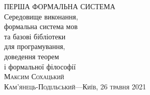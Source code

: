 \frontmatter
\thispagestyle{empty}
\mbox{}\vspace{1in}
\noindent
\begin{flushright}
\vspace{0.5cm}
\Huge ПЕРША ФОРМАЛЬНА СИСТЕМА \\
\vspace{0.5cm}
{\huge Середовище виконання, \\
        \huge формальна система мов \\
        \huge та базові бібліотеки \\
        \huge для програмування, \\
        \huge доведення теорем \\
        \huge і формальної філософії \\
}
\vspace{1em}
\vspace{6cm}
\hfill{\Large\scshape{}Максим Сохацький \\
             \scshape{}Кам'янець-Подільський---Київ, 26 травня 2021\\
}
\vspace{0.3cm}
\hfill{}
\end{flushright}
\newpage
\\
\cleartorecto
\tableofcontents*
\mainmatter
